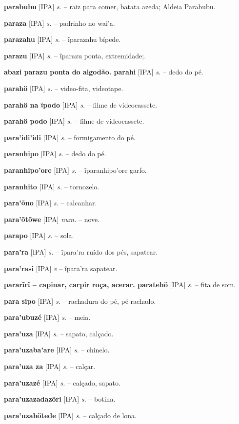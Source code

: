 \textbf{parabubu} [IPA] \textit{s.} -- raiz para comer, batata azeda; Aldeia Parabubu.

\textbf{paraza} [IPA] \textit{s.} -- padrinho no wai'a.

\textbf{parazahu} [IPA] \textit{s.} -- ĩparazahu bípede.

\textbf{parazu} [IPA] \textit{s.} -- ĩparazu ponta, extremidade;.

\textbf{abazi parazu ponta do algodão. parahi} [IPA] \textit{s.} -- dedo do pé.

\textbf{parahö} [IPA] \textit{s.} -- video-fita, videotape.

\textbf{parahö na ĩpodo} [IPA] \textit{s.} -- filme de videocassete.

\textbf{parahö podo} [IPA] \textit{s.} -- filme de videocassete.

\textbf{para'idi'idi} [IPA] \textit{s.} -- formigamento do pé.

\textbf{paranhipo} [IPA] \textit{s.} -- dedo do pé.

\textbf{paranhipo'ore} [IPA] \textit{s.} -- ĩparanhipo'ore garfo.

\textbf{paranhito} [IPA] \textit{s.} -- tornozelo.

\textbf{para'õno} [IPA] \textit{s.} -- calcanhar.

\textbf{para'õtõwe} [IPA] \textit{num.} -- nove.

\textbf{parapo} [IPA] \textit{s.} -- sola.

\textbf{para'ra} [IPA] \textit{s.} -- ĩpara'ra ruído dos pés, sapatear.

\textbf{para'rasi} [IPA] \textit{v} -- ĩpara'ra sapatear.

\textbf{pararĩrĩ -- capinar, carpir roça, acerar. paratehö} [IPA] \textit{s.} -- fita de som.

\textbf{para sipo} [IPA] \textit{s.} -- rachadura do pé, pé rachado.

\textbf{para'ubuzé} [IPA] \textit{s.} -- meia.

\textbf{para'uza} [IPA] \textit{s.} -- sapato, calçado.

\textbf{para'uzaba'are} [IPA] \textit{s.} -- chinelo.

\textbf{para'uza za} [IPA] \textit{s.} -- calçar.

\textbf{para'uzazé} [IPA] \textit{s.} -- calçado, sapato.

\textbf{para'uzazadazöri} [IPA] \textit{s.} -- botina.

\textbf{para'uzahötede} [IPA] \textit{s.} -- calçado de lona.

